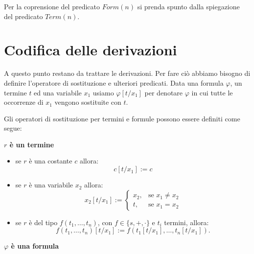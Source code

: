 Per la coprensione del predicato $Form(n)$ si prenda spunto dalla spiegazione del predicato $Term(n)$.

\section{Codifica delle derivazioni}

A questo punto restano da trattare le derivazioni. Per fare ci\`o abbiamo bisogno di definire  l'operatore di sostituzione e ulteriori predicati.
Data una formula $\varphi$, un termine $t$ ed una variabile $x_1$ usiamo $\varphi [t/x_1]$ per denotare  $\varphi$ in cui tutte le occorrenze di $x_1$ vengono sostituite con $t$.

Gli operatori di sostituzione per  termini e  formule possono essere definiti  come segue:

\textbf{$r$ \`e un termine}
\begin{itemize}

\item se $r$ \`e una costante $c$ allora:
$$
c[t/x_1] := c
$$
\item se $r$ \`e una variabile $x_2$ allora:
\begin{displaymath}
 x_2[t/x_1]:= \left \{ \begin{array}{ll}
x_2, & \textrm{se $x_1 \ne x_2$}\\
t, & \textrm{se $x_1 = x_2$}
\end{array}\right.
\end{displaymath}
\item se $r$ \`e del tipo $f(t_1,\ldots, t_n)$, con $f \in \{s,+,\cdot \}$ e $t_i$ termini, allora:
$$
f(t_1,\ldots, t_n)[t/x_1] := f(t_1[t/x_1],\ldots, t_n[t/x_1]).
$$
\end{itemize}

\textbf{$\varphi$ \`e una formula}

